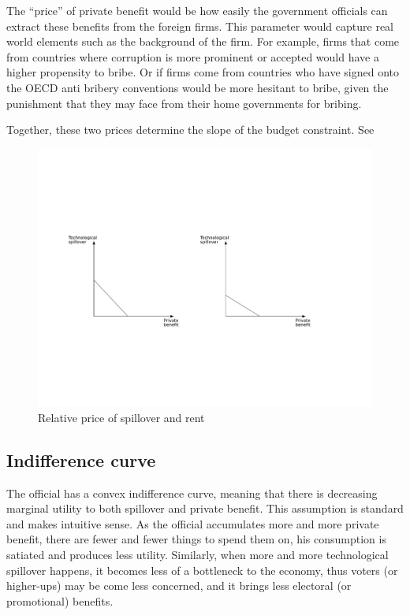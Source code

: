The ``price'' of private benefit would be how easily the government officials can extract these benefits from the foreign firms. This parameter would capture real world elements such as the background of the firm. For example, firms that come from countries where corruption is more prominent or accepted would have a higher propensity to bribe. Or if firms come from countries who have signed onto the OECD anti bribery conventions would be more hesitant to bribe, given the punishment that they may face from their home governments for bribing.

Together, these two prices determine the slope of the budget constraint. See 

\begin{figure}[!ht]
	\centering
    \includegraphics[width=\textwidth, height=\textheight,keepaspectratio]{../figure/absorptive_capacity}
    \caption{Relative price of spillover and rent}
    \label{fig:relative_price}
\end{figure}

\subsection{Indifference curve}

The official has a convex indifference curve, meaning that there is decreasing marginal utility to both spillover and private benefit. This assumption is standard and makes intuitive sense. As the official accumulates more and more private benefit, there are fewer and fewer things to spend them on, his consumption is satiated and produces less utility. Similarly, when more and more technological spillover happens, it becomes less of a bottleneck to the economy, thus voters (or higher-ups) may be come less concerned, and it brings less electoral (or promotional) benefits.

